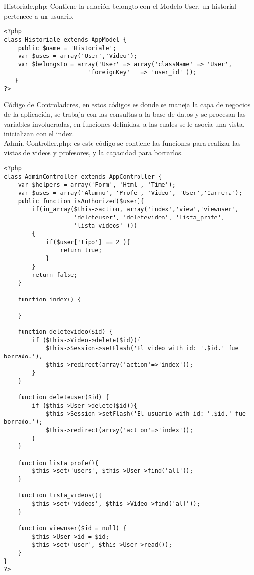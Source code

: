 \documentclass[12pt]{article}
\begin{document}
Historiale.php: Contiene la relación belongto con el Modelo User, un historial pertenece a un usuario.\\

\footnotesize\begin{verbatim}
<?php
class Historiale extends AppModel {
	public $name = 'Historiale';
    var $uses = array('User','Video');
    var $belongsTo = array('User' => array('className' => 'User',
						'foreignKey'   => 'user_id' ));
   }	
?>
\end{verbatim}

Código de Controladores, en estos códigos es donde se maneja la capa de negocios de la aplicación, se trabaja 
con las consultas a la base de datos y se procesan las variables involucradas, en funciones definidas, 
a las cuales se le asocia una vista, inicializan con el index.\\

Admin Controller.php: es este código se contiene las funciones para realizar las vistas de videos y profesores, 
y la capacidad para borrarlos.\\
\footnotesize
\begin{verbatim}
<?php
class AdminController extends AppController {
	var $helpers = array('Form', 'Html', 'Time');
	var $uses = array('Alumno', 'Profe', 'Video', 'User','Carrera');
	public function isAuthorized($user){
		if(in_array($this->action, array('index','view','viewuser', 
					'deleteuser', 'deletevideo', 'lista_profe', 
					'lista_videos' )))
		{
			if($user['tipo'] == 2 ){
				return true;
			}
		}
		return false;
	}
	
	function index() {

	}

	function deletevideo($id) {
		if ($this->Video->delete($id)){
			$this->Session->setFlash('El video with id: '.$id.' fue borrado.');
			$this->redirect(array('action'=>'index'));
		}
	}

	function deleteuser($id) {
		if ($this->User->delete($id)){
			$this->Session->setFlash('El usuario with id: '.$id.' fue borrado.');
			$this->redirect(array('action'=>'index'));
		}
	}
	
	function lista_profe(){
		$this->set('users', $this->User->find('all'));
	}

	function lista_videos(){
		$this->set('videos', $this->Video->find('all'));
	}
	
	function viewuser($id = null) {
		$this->User->id = $id;
		$this->set('user', $this->User->read());
	}
}
?>
\end{verbatim}
\end{document}
